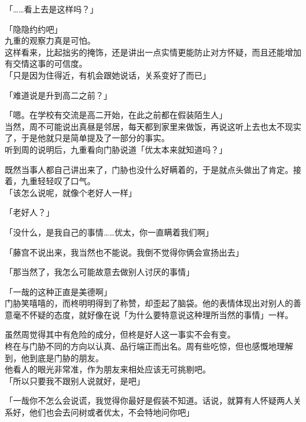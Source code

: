 「……看上去是这样吗？」

「隐隐约约吧」\\

九重的观察力真是可怕。\\

这样看来，比起拙劣的掩饰，还是讲出一点实情更能防止对方怀疑，而且还能增加有交情这事的可信度。\\

「只是因为住得近，有机会跟她说话，关系变好了而已」

「难道说是升到高二之前？」

「嗯。在学校有交流是高二开始，在此之前都在假装陌生人」\\

当然，周不可能说出真昼是邻居，每天都到家里来做饭，再说这听上去也太不现实了，于是他就只是简单提及了一部分的事实。\\

听到周的说明后，九重看向门胁说道「优太本来就知道吗？」

既然当事人都自己讲出来了，门胁也没什么好瞒着的，于是就点头做出了肯定。接着，九重轻轻叹了口气。\\

「该怎么说呢，就像个老好人一样」

「老好人？」

「没什么，是我自己的事情……优太，你一直瞒着我们啊」

「藤宫不说出来，我当然也不能说。我倒不觉得你俩会宣扬出去」

「那当然了，我怎么可能故意去做别人讨厌的事情」

「一哉的这种正直是美德啊」\\

门胁笑嘻嘻的，而柊明明得到了称赞，却歪起了脑袋。他的表情体现出对别人的善意毫不怀疑的态度，就好像在说「为什么要特意说这种理所当然的事情」一样。

虽然周觉得其中有危险的成分，但柊是好人这一事实不会有变。\\

柊在与门胁不同的方向以认真、品行端正而出名。周有些吃惊，但也感慨地理解到，他到底是门胁的朋友。\\

他看人的眼光非常准，作为朋友来相处应该无可挑剔吧。\\

「所以只要我不跟别人说就好，是吧」

「一哉你不怎么会说谎，我觉得你最好是假装不知道。话说，就算有人怀疑两人关系好，他们也会去问树或者优太，不会特地问你吧」

